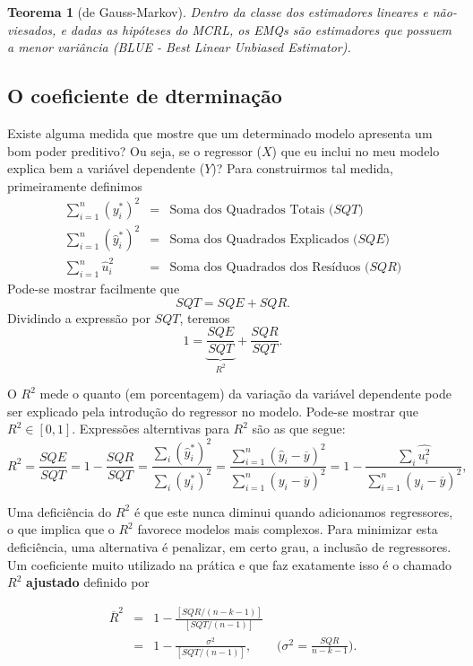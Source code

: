 \documentclass[
]{book}
\newtheorem{theorem}{Teorema}[chapter]
\theoremstyle{definition}
\theoremstyle{definition}
\theoremstyle{definition}
\theoremstyle{remark}
\begin{document}
\begin{theorem}[de Gauss-Markov]
\protect\hypertarget{thm:thmGM}{}{\label{thm:thmGM} {} }Dentro da classe dos estimadores lineares e não-viesados, e dadas
as hipóteses do MCRL, os EMQs são estimadores que possuem a menor
variância (BLUE - Best Linear Unbiased Estimator).
\end{theorem}

\hypertarget{o-coeficiente-de-dterminauxe7uxe3o}{%
\subsection{O coeficiente de dterminação}\label{o-coeficiente-de-dterminauxe7uxe3o}}

Existe alguma medida que mostre que um determinado modelo apresenta um bom
poder preditivo? Ou seja, se o regressor (\(X\)) que eu inclui no
meu modelo explica bem a variável dependente (\(Y\))? Para construirmos tal medida, primeiramente definimos
\begin{eqnarray*}
  \sum_{i=1}^n(y_i^*)^2 &=& \mbox{Soma dos Quadrados Totais ($SQT$)} \\
  \sum_{i=1}^n(\widehat{y}_i^*)^2 &=& \mbox{Soma dos Quadrados Explicados ($SQE$)} \\
  \sum_{i=1}^n\widehat{u}_i^2 &=& \mbox{Soma dos Quadrados dos Resíduos ($SQR$)}
\end{eqnarray*}
Pode-se mostrar facilmente que
\[SQT=SQE+SQR.\]
Dividindo a expressão por \(SQT\), teremos
\[1=\underbrace{\frac{SQE}{SQT}}_{R^2}+\frac{SQR}{SQT}.\]

O \(R^2\) mede o quanto (em porcentagem) da variação da variável dependente pode ser explicado pela introdução do regressor no modelo. Pode-se mostrar que \(R^2 \in [0,1]\).
Expressões alterntivas para \(R^2\) são as que segue:
\[ R^2 = \frac{SQE}{SQT}=1-\frac{SQR}{SQT} =\frac{\sum_i(\widehat{y}_i^*)^2}{\sum_i(y_i^*)^2}=\frac{\sum_{i=1}^n(\widehat{y}_i-\overline{y})^2}{\sum_{i=1}^n(y_i-\overline{y})^2} =1-\frac{\sum_i\widehat{u_i^2}}{\sum_{i=1}^n(y_i-\overline{y})^2},\]

Uma deficiência do \(R^2\) é que este nunca diminui quando adicionamos regressores, o que implica que o \(R^2\) favorece modelos mais complexos. Para minimizar esta deficiência, uma alternativa é penalizar, em certo grau, a inclusão de regressores. Um coeficiente muito utilizado na prática e que faz exatamente isso é o chamado \(R^2\) \textbf{ajustado} definido por

\begin{eqnarray*}
  \overline{R}^2 &=& 1-\frac{[SQR/(n-k-1)]}{[SQT/(n-1)]} \\
   &=& 1- \frac{\sigma^2}{[SQT/(n-1)]},\qquad  \bigg(\sigma^2=\frac{SQR}{n-k-1}\bigg).
\end{eqnarray*}
\end{document}
